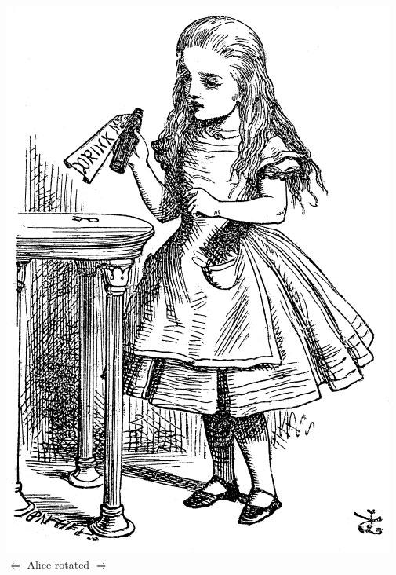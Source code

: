\documentclass{article}
\begin{document}
\includegraphics[scale=0.1,angle=90]{alice}
$\Leftarrow$ Alice rotated $\Rightarrow$ 
\end{document}
